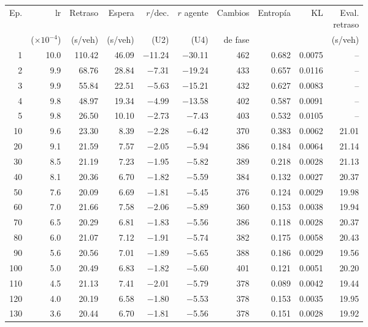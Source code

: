 \begin{table}[H]
\centering
\scriptsize
\setlength{\tabcolsep}{3pt}
\setlength{\tabcolsep}{2pt}
\begin{tabular}{rrrrrrrrrr}
\toprule
Ep. & lr & Retraso & Espera & $r$/dec. & $r$ agente & Cambios & Entropía & KL & \makecell{Eval.\\retraso} \\
 & ($\times 10^{-4}$) & (s/veh) & (s/veh) & (U2) & (U4) & de fase &  &  & (s/veh) \\
\midrule
1 & 10.0 & 110.42 & 46.09 & $-$11.24 & $-$30.11 & 462 & 0.682 & 0.0075 & -- \\
2 & 9.9 & 68.76 & 28.84 & $-$7.31 & $-$19.24 & 433 & 0.657 & 0.0116 & -- \\
3 & 9.9 & 55.84 & 22.51 & $-$5.63 & $-$15.21 & 432 & 0.627 & 0.0083 & -- \\
4 & 9.8 & 48.97 & 19.34 & $-$4.99 & $-$13.58 & 402 & 0.587 & 0.0091 & -- \\
5 & 9.8 & 26.50 & 10.10 & $-$2.73 & $-$7.43 & 403 & 0.532 & 0.0105 & -- \\
10 & 9.6 & 23.30 & 8.39 & $-$2.28 & $-$6.42 & 370 & 0.383 & 0.0062 & 21.01 \\
20 & 9.1 & 21.59 & 7.57 & $-$2.05 & $-$5.94 & 386 & 0.184 & 0.0064 & 21.14 \\
30 & 8.5 & 21.19 & 7.23 & $-$1.95 & $-$5.82 & 389 & 0.218 & 0.0028 & 21.13 \\
40 & 8.1 & 20.36 & 6.70 & $-$1.82 & $-$5.59 & 384 & 0.132 & 0.0027 & 20.37 \\
50 & 7.6 & 20.09 & 6.69 & $-$1.81 & $-$5.45 & 376 & 0.124 & 0.0029 & 19.98 \\
60 & 7.0 & 21.66 & 7.58 & $-$2.06 & $-$5.89 & 360 & 0.153 & 0.0038 & 19.94 \\
70 & 6.5 & 20.29 & 6.81 & $-$1.83 & $-$5.56 & 386 & 0.118 & 0.0028 & 20.37 \\
80 & 6.0 & 21.07 & 7.12 & $-$1.91 & $-$5.74 & 382 & 0.175 & 0.0058 & 20.43 \\
90 & 5.6 & 20.56 & 7.01 & $-$1.89 & $-$5.65 & 388 & 0.186 & 0.0029 & 19.56 \\
100 & 5.0 & 20.49 & 6.83 & $-$1.82 & $-$5.60 & 401 & 0.121 & 0.0051 & 20.20 \\
110 & 4.5 & 21.13 & 7.41 & $-$2.01 & $-$5.79 & 378 & 0.089 & 0.0042 & 19.44 \\
120 & 4.0 & 20.19 & 6.58 & $-$1.80 & $-$5.53 & 378 & 0.153 & 0.0035 & 19.95 \\
130 & 3.6 & 20.44 & 6.70 & $-$1.81 & $-$5.56 & 378 & 0.151 & 0.0028 & 19.92 \\

\end{tabular}
\end{table}
